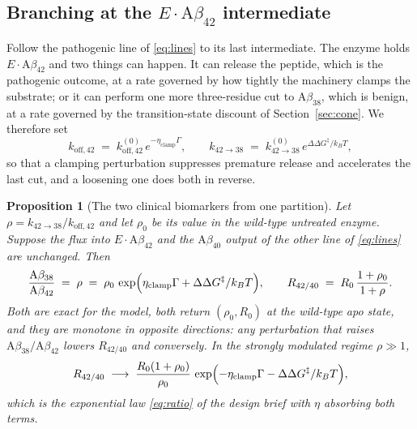 \documentclass[11pt,reqno]{amsart}
\theoremstyle{plain}
\newtheorem{proposition}[theorem]{Proposition}
\theoremstyle{definition}
\theoremstyle{remark}
\numberwithin{equation}{section}
\newcommand{\Ab}{\mathrm{A}\beta}
\newcommand{\kT}{k_{B}T}
\begin{document}
\subsection{Branching at the \texorpdfstring{$E\cdot\Ab_{42}$}{E.Abeta42} intermediate}
\label{sec:branch}
Follow the pathogenic line of \eqref{eq:lines} to its last intermediate. The enzyme holds $E\cdot\Ab_{42}$ and two things can happen. It can release the peptide, which is the pathogenic outcome, at a rate governed by how tightly the machinery clamps the substrate; or it can perform one more three-residue cut to $\Ab_{38}$, which is benign, at a rate governed by the transition-state discount of Section~\ref{sec:cone}. We therefore set
\begin{equation}
\label{eq:rates}
k_{\mathrm{off},42}\;=\;k_{\mathrm{off},42}^{(0)}\,e^{-\eta_{\mathrm{clamp}}\Gamma},
\qquad
k_{42\to38}\;=\;k_{42\to38}^{(0)}\,e^{\Delta\Delta G^{\ddagger}/\kT},
\end{equation}
so that a clamping perturbation suppresses premature release and accelerates the last cut, and a loosening one does both in reverse.

\begin{proposition}[The two clinical biomarkers from one partition]
\label{prop:branch}
Let $\rho=k_{42\to38}/k_{\mathrm{off},42}$ and let $\rho_0$ be its value in the wild-type untreated enzyme. Suppose the flux into $E\cdot\Ab_{42}$ and the $\Ab_{40}$ output of the other line of \eqref{eq:lines} are unchanged. Then
\begin{equation}
\label{eq:branchlaws}
\frac{\Ab_{38}}{\Ab_{42}}\;=\;\rho\;=\;\rho_0\,
\exp\Bigl(\eta_{\mathrm{clamp}}\Gamma+\Delta\Delta G^{\ddagger}/\kT\Bigr),
\qquad
R_{42/40}\;=\;R_0\,\frac{1+\rho_0}{1+\rho}.
\end{equation}
Both are exact for the model, both return $(\rho_0,R_0)$ at the wild-type apo state, and they are monotone in opposite directions: any perturbation that raises $\Ab_{38}/\Ab_{42}$ lowers $R_{42/40}$ and conversely. In the strongly modulated regime $\rho\gg1$,
\begin{equation}
\label{eq:limit}
R_{42/40}\;\longrightarrow\;\frac{R_0(1+\rho_0)}{\rho_0}\,
\exp\Bigl(-\eta_{\mathrm{clamp}}\Gamma-\Delta\Delta G^{\ddagger}/\kT\Bigr),
\end{equation}
which is the exponential law \eqref{eq:ratio} of the design brief with $\eta$ absorbing both terms.
\end{proposition}
\end{document}
